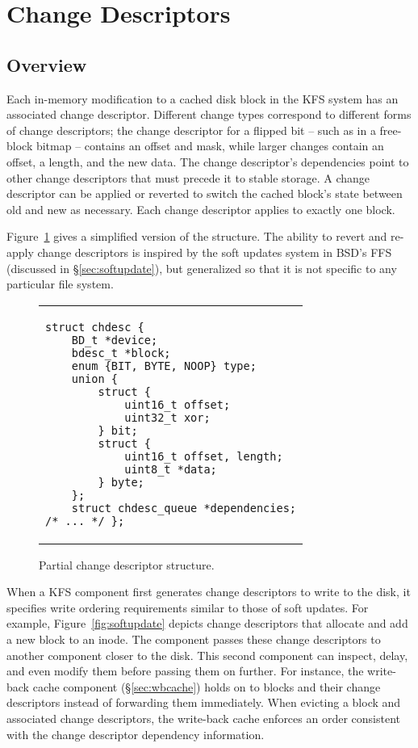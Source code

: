 \section {Change Descriptors}
\label{sec:chdescs}

\subsection {Overview}
Each in-memory modification to a cached disk block in the KFS system has an
associated change descriptor. Different change types correspond to different
forms of change descriptors; the change descriptor for a flipped bit -- such as
in a free-block bitmap -- contains an offset and mask, while larger changes
contain an offset, a length, and the new data. The change descriptor's
dependencies point to other change descriptors that must precede it to stable
storage. A change descriptor can be applied or reverted to switch the cached
block's state between old and new as necessary. Each change descriptor applies
to exactly one block.

Figure~\ref{fig:chdesc} gives a simplified version of the structure. The ability
to revert and re-apply change descriptors is inspired by the soft updates system
in BSD's FFS~\cite{ganger00soft} (discussed in \S\ref{sec:softupdate}), but
generalized so that it is not specific to any particular file system.

\begin{figure}
\vskip-14pt
\begin{tabular}{@{\hskip0.58in}p{2in}@{}}
\begin{scriptsize}
\begin{verbatim}
struct chdesc {
    BD_t *device;
    bdesc_t *block;
    enum {BIT, BYTE, NOOP} type;
    union {
        struct {
            uint16_t offset;
            uint32_t xor;
        } bit;
        struct {
            uint16_t offset, length;
            uint8_t *data;
        } byte;
    };
    struct chdesc_queue *dependencies;
/* ... */ };
\end{verbatim}
\end{scriptsize}
\end{tabular}
\vspace{-10pt}
\caption{\label{fig:chdesc} Partial change descriptor structure.}
\end{figure}

When a KFS component first generates change descriptors to write to the disk, it
specifies write ordering requirements similar to those of soft updates. For
example, Figure~\ref{fig:softupdate} depicts change descriptors that allocate
and add a new block to an inode. The component passes these change descriptors
to another component closer to the disk. This second component can inspect,
delay, and even modify them before passing them on further. For instance, the
write-back cache component (\S\ref{sec:wbcache}) holds on to blocks and their
change descriptors instead of forwarding them immediately. When evicting a block
and associated change descriptors, the write-back cache enforces an order
consistent with the change descriptor dependency information.

